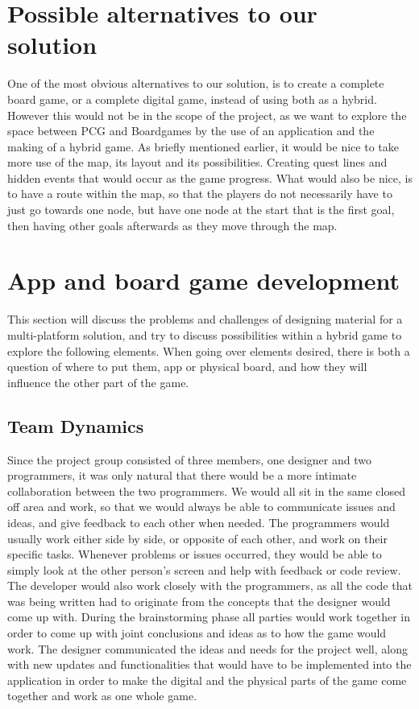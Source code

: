 \section{Possible alternatives to our solution}
One of the most obvious alternatives to our solution, is to create a complete board game, or a complete digital game, instead of using both as a hybrid. However this would not be in the scope of the project, as we want to explore the space between PCG and Boardgames by the use of an application and the making of a hybrid game.
As briefly mentioned earlier, it would be nice to take more use of the map, its layout and its possibilities. Creating quest lines and hidden events that would occur as the game progress. What would also be nice, is to have a route within the map, so that the players do not necessarily have to just go towards one node, but have one node at the start that is the first goal, then having other goals afterwards as they move through the map. 

\section{App and board game development}
This section will discuss the problems and challenges of designing material for a multi-platform solution, and try to discuss possibilities within a hybrid game to explore the following elements.
When going over elements desired, there is both a question of where to put them, app or physical board, and how they will influence the other part of the game. 
\subsection{Team Dynamics}
Since the project group consisted of three members, one designer and two programmers, it was only natural that there would be a more intimate collaboration between the two programmers. We would all sit in the same closed off area and work, so that we would always be able to communicate issues and ideas, and give feedback to each other when needed. The programmers would usually work either side by side, or opposite of each other, and work on their specific tasks. Whenever problems or issues occurred, they would be able to simply look at the other person's screen and help with feedback or code review. The developer would also work closely with the programmers, as all the code that was being written had to originate from the concepts that the designer would come up with. During the brainstorming phase all parties would work together in order to come up with joint conclusions and ideas as to how the game would work. The designer communicated the ideas and needs for the project well, along with new updates and functionalities that would have to be implemented into the application in order to make the digital and the physical parts of the game come together and work as one whole game. 

